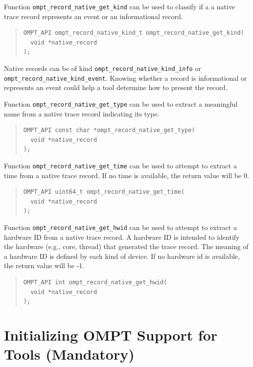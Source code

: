\documentclass{article}
\begin{document}
Function  \verb|ompt_record_native_get_kind| can be used to classify if a a native trace record represents an event or an informational record.
\begin{quote}
\begin{verbatim}
OMPT_API ompt_record_native_kind_t ompt_record_native_get_kind(
  void *native_record 
);
\end{verbatim}
\end{quote}
Native records can be of kind \verb|ompt_record_native_kind_info| or \verb|ompt_record_native_kind_event|. Knowing whether a record is informational or represents an event could help a tool determine how to present the record.

Function  \verb|ompt_record_native_get_type| can be used to extract a meaningful name from a native trace record indicating its type.
\begin{quote}
\begin{verbatim}
OMPT_API const char *ompt_record_native_get_type(
  void *native_record 
);
\end{verbatim}
\end{quote}

Function  \verb|ompt_record_native_get_time| can be used to attempt to extract a time from a native trace record. If no time is available, the return value will be 0.
\begin{quote}
\begin{verbatim}
OMPT_API uint64_t ompt_record_native_get_time(
  void *native_record
);
\end{verbatim}
\end{quote}

Function  \verb|ompt_record_native_get_hwid| can be used to attempt to extract a hardware ID from a native trace record. A hardware ID is intended to identify the hardware (e.g., core, thread) that generated the trace record. The meaning of a hardware ID is defined by each kind of device. If no hardware id is available, the return value will be -1.
\begin{quote}
\begin{verbatim}
OMPT_API int ompt_record_native_get_hwid(
  void *native_record
);
\end{verbatim}
\end{quote}

\section{Initializing OMPT Support for Tools (Mandatory)}
\label{sec:enabling}
\end{document}
